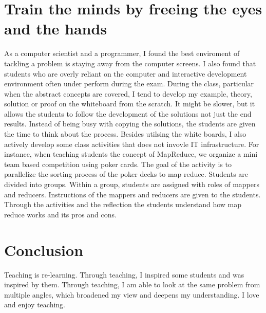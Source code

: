 \documentclass[12pt]{article}
\theoremstyle{plain} \numberwithin{equation}{section}
\theoremstyle{definition}
\begin{document}
\section{Train the minds by freeing the eyes and the hands}
As a computer scientist and a programmer, I found the best enviroment
of tackling a problem is staying away from the computer screens. I
also found that students who are overly reliant on the computer and
interactive development environment often under perform during the
exam. During the class, particular when the abstract concepts are
covered, I tend to develop my example, theory, solution or proof on
the whiteboard from the scratch. It might be slower, but it allows 
the students to follow the development of the
solutions not just the end results. Instead of being busy with copying
the solutions, the students are given the time to think about the
process. Besides utilsing the white boards, I also actively develop
some class activities that does not invovle IT infrastructure. For
instance, when teaching students the concept of MapReduce, we organize
a mini team based competition using poker cards. The goal of the activity is to parallelize the
sorting process of the poker decks to map reduce. 
Students are divided into groups. Within a group, students are assigned with roles of
mappers and reducers. Instructions of the mappers and reducers are
given to the students. Through the activities and the reflection the students understand
how map reduce works and its pros and cons. 

\section{Conclusion}
Teaching is re-learning. Through teaching, I inspired some
students and was inspired by them. Through teaching, I am able to look at
the same problem from multiple angles, which broadened my view and deepens my
understanding. I love and enjoy teaching. 
\end{document}
